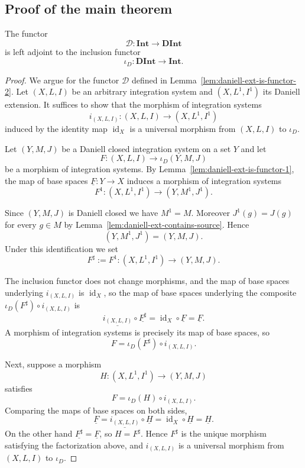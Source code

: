 \subsection{Proof of the main theorem}\label{sec:main-theorem}

\begin{theorem}\label{thm:main-theorem}
  The functor
  \[
    \mathcal{D}:\mathbf{Int}\to\mathbf{DInt}
  \]
  is left adjoint to the inclusion functor
  \[
    \iota_{D}:\mathbf{DInt}\to\mathbf{Int} .
  \]
\end{theorem}
\begin{proof}
  We argue for the functor $\mathcal{D}$ defined in
  Lemma~\ref{lem:daniell-ext-is-functor-2}. Let $(X,L,I)$ be an arbitrary
  integration system and $(X,L^1,I^1)$ its Daniell extension.
  It suffices to show that the morphism of integration systems
  \[
    i_{(X,L,I)}:(X,L,I)\to(X,L^1,I^1)
  \]
  induced by the identity map $\operatorname{id}_X$ is a universal morphism from
  $(X,L,I)$ to $\iota_{D}$.

  Let $(Y,M,J)$ be a Daniell closed integration system on a set $Y$ and
  let
  \[
    F:(X,L,I)\to\iota_{D}(Y,M,J)
  \]
  be a morphism of integration systems. By
  Lemma~\ref{lem:daniell-ext-is-functor-1}, the map of base spaces
  $\underline{F}:Y\to X$ induces a morphism of integration systems
  \[
    F^1:(X,L^1,I^1)\to(Y,M^1,J^1) .
  \]

  Since $(Y,M,J)$ is Daniell closed we have $M^1=M$. Moreover
  $J^1(g)=J(g)$ for every $g\in M$ by
  Lemma~\ref{lem:daniell-ext-contains-source}. Hence
  \[
    (Y,M^1,J^1)=(Y,M,J) .
  \]
  Under this identification we set
  \[
    F^\sharp:=F^1:(X,L^1,I^1)\to(Y,M,J) .
  \]

  The inclusion functor does not change morphisms, and the map of base spaces
  underlying $i_{(X,L,I)}$ is $\operatorname{id}_X$, so the map of base spaces
  underlying the composite $\iota_{D}(F^\sharp)\circ i_{(X,L,I)}$ is
  \[
    \underline{i_{(X,L,I)}}\circ\underline{F^\sharp}
    =\operatorname{id}_X\circ\underline{F}
    =\underline{F} .
  \]
  A morphism of integration systems is precisely its map of base spaces, so
  \[
    F=\iota_{D}(F^\sharp)\circ i_{(X,L,I)} .
  \]

  Next, suppose a morphism
  \[
    H:(X,L^1,I^1)\to(Y,M,J)
  \]
  satisfies
  \[
    F=\iota_{D}(H)\circ i_{(X,L,I)} .
  \]
  Comparing the maps of base spaces on both sides,
  \[
    \underline{F}
    =\underline{i_{(X,L,I)}}\circ\underline{H}
    =\operatorname{id}_X\circ\underline{H}
    =\underline{H} .
  \]
  On the other hand $\underline{F^\sharp}=\underline{F}$, so $H=F^\sharp$.
  Hence $F^\sharp$ is the unique morphism satisfying the factorization above,
  and $i_{(X,L,I)}$ is a universal morphism from $(X,L,I)$ to $\iota_{D}$.


\end{proof}
